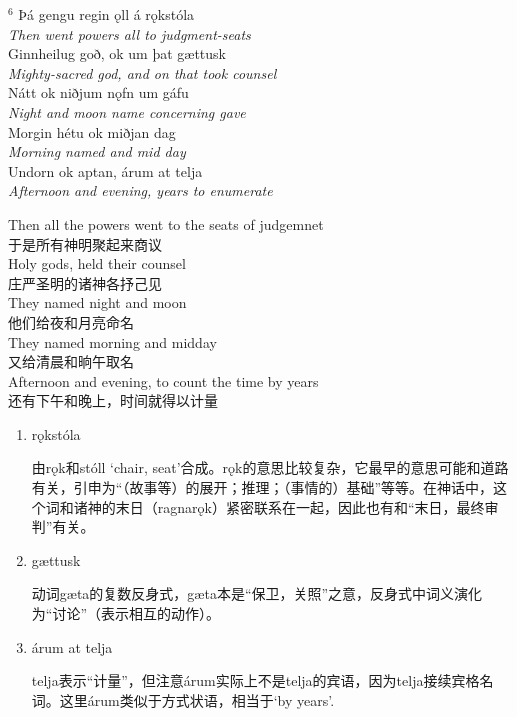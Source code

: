 \begin{paracol}{2}
    \noindent
    $^6 $ Þá gengu regin ǫll á rǫkstóla\\
    \textit{Then went powers all to judgment-seats}\\
    Ginnheilug goð, ok um þat gættusk\\
    \textit{Mighty-sacred god, and on that took counsel}\\
    Nátt ok niðjum nǫfn um gáfu\\
    \textit{Night and moon name concerning gave}\\
    Morgin hétu ok miðjan dag\\
    \textit{Morning named and mid day}\\
    Undorn ok aptan, árum at telja\\
    \textit{Afternoon and evening, years to enumerate}\\

    \switchcolumn

    \noindent
    Then all the powers went to the seats of judgemnet\\
    于是所有神明聚起来商议\\
    Holy gods, held their counsel\\
    庄严圣明的诸神各抒己见\\
    They named night and moon\\
    他们给夜和月亮命名\\
    They named morning and midday\\
    又给清晨和晌午取名\\
    Afternoon and evening, to count the time by years\\
    还有下午和晚上，时间就得以计量\\

\end{paracol}
\begin{grammar*}{}
    \begin{enumerate}[leftmargin=*]

        \item rǫkstóla

              由rǫk和stóll `chair, seat'合成。rǫk的意思比较复杂，它最早的意思可能和道路有关，引申为“（故事等）的展开；推理；（事情的）基础”等等。在神话中，这个词和诸神的末日（ragnarǫk）紧密联系在一起，因此也有和“末日，最终审判”有关。

        \item gættusk

              动词gæta的复数反身式，gæta本是“保卫，关照”之意，反身式中词义演化为“讨论”（表示相互的动作）。

        \item árum at telja

              telja表示“计量”，但注意árum实际上不是telja的宾语，因为telja接续宾格名词。这里árum类似于方式状语，相当于`by years'.
    \end{enumerate}
\end{grammar*}
\medskip %

